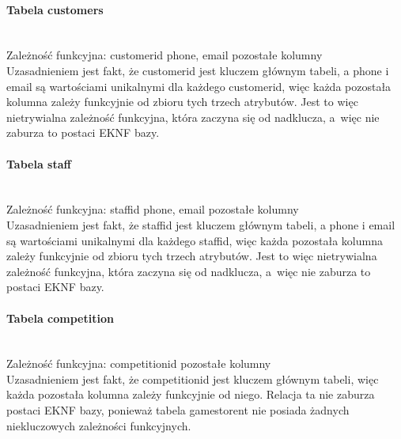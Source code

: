 \documentclass{article}
\begin{document}
	\paragraph{Tabela customers}\mbox{}\vspace{0.2cm} \\
	Zależność funkcyjna: \textbraceleft customer\textunderscore id phone, email\textbraceright \mbox{} \textrightarrow \mbox{} pozostałe kolumny \vspace{0.2cm} \\
	\noindent Uzasadnieniem jest fakt, że customer\textunderscore id jest kluczem głównym tabeli, a phone i email są wartościami unikalnymi dla każdego customer\textunderscore id, więc każda pozostała kolumna zależy funkcyjnie od zbioru tych trzech atrybutów. Jest to więc nietrywialna zależność funkcyjna, która zaczyna się od nadklucza, a~więc nie zaburza to postaci EKNF bazy.
	
	\paragraph{Tabela staff}\mbox{}\vspace{0.2cm} \\
	Zależność funkcyjna: \textbraceleft staff\textunderscore id phone, email\textbraceright \mbox{} \textrightarrow \mbox{} pozostałe kolumny \vspace{0.2cm} \\
	\noindent Uzasadnieniem jest fakt, że staff\textunderscore id jest kluczem głównym tabeli, a phone i email są wartościami unikalnymi dla każdego staff\textunderscore id, więc każda pozostała kolumna zależy funkcyjnie od zbioru tych trzech atrybutów. Jest to więc nietrywialna zależność funkcyjna, która zaczyna się od nadklucza, a~więc nie zaburza to postaci EKNF bazy.
	
	\paragraph{Tabela competition}\mbox{}\vspace{0.2cm} \\
	Zależność funkcyjna: competition\textunderscore id\mbox{} \textrightarrow \mbox{} pozostałe kolumny \vspace{0.2cm} \\
	\noindent Uzasadnieniem jest fakt, że competition\textunderscore id jest kluczem głównym tabeli, więc każda pozostała kolumna zależy funkcyjnie od niego. Relacja ta nie zaburza postaci EKNF bazy, ponieważ tabela games\textunderscore to\textunderscore rent nie posiada żadnych niekluczowych zależności funkcyjnych.
	
\end{document}
